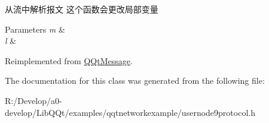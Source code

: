 从流中解析报文 这个函数会更改局部变量 


\begin{DoxyParams}{Parameters}
{\em m} & \\
\hline
{\em l} & \\
\hline
\end{DoxyParams}


Reimplemented from \mbox{\hyperlink{class_q_qt_message_a0bc25669bdd61490b1d8df6d77565f31}{Q\+Qt\+Message}}.



The documentation for this class was generated from the following file\+:\begin{DoxyCompactItemize}
\item 
R\+:/\+Develop/a0-\/develop/\+Lib\+Q\+Qt/examples/qqtnetworkexample/usernode9protocol.\+h\end{DoxyCompactItemize}
